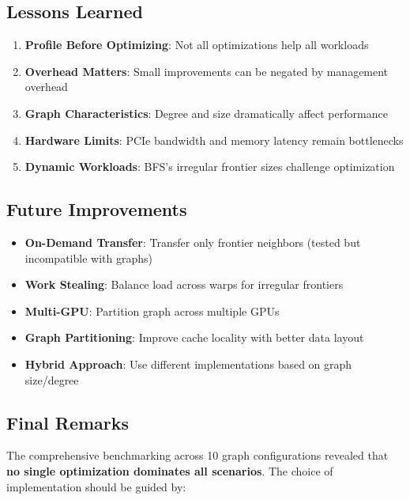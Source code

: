 \documentclass[11pt,a4paper]{article}
\begin{document}
\subsection{Lessons Learned}

\begin{tcolorbox}[colback=blue!5!white,colframe=blue!75!black,title=Important Takeaways]
\begin{enumerate}
    \item \textbf{Profile Before Optimizing}: Not all optimizations help all workloads
    \item \textbf{Overhead Matters}: Small improvements can be negated by management overhead
    \item \textbf{Graph Characteristics}: Degree and size dramatically affect performance
    \item \textbf{Hardware Limits}: PCIe bandwidth and memory latency remain bottlenecks
    \item \textbf{Dynamic Workloads}: BFS's irregular frontier sizes challenge optimization
\end{enumerate}
\end{tcolorbox}

\subsection{Future Improvements}

\begin{itemize}
    \item \textbf{On-Demand Transfer}: Transfer only frontier neighbors (tested but incompatible with graphs)
    \item \textbf{Work Stealing}: Balance load across warps for irregular frontiers
    \item \textbf{Multi-GPU}: Partition graph across multiple GPUs
    \item \textbf{Graph Partitioning}: Improve cache locality with better data layout
    \item \textbf{Hybrid Approach}: Use different implementations based on graph size/degree
\end{itemize}

\subsection{Final Remarks}

The comprehensive benchmarking across 10 graph configurations revealed that \textbf{no single optimization dominates all scenarios}. The choice of implementation should be guided by:
\end{document}
